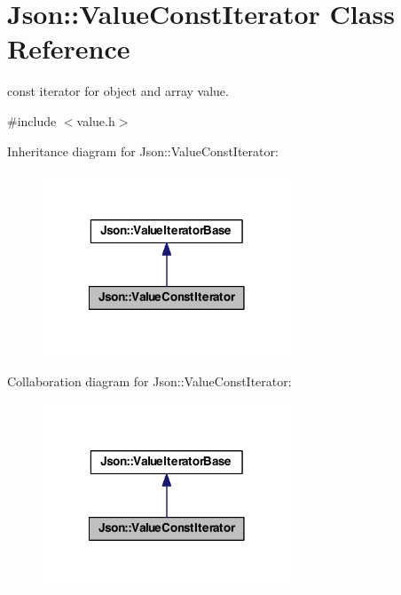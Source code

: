 \hypertarget{class_json_1_1_value_const_iterator}{\section{Json\-:\-:Value\-Const\-Iterator Class Reference}
\label{class_json_1_1_value_const_iterator}
}


const iterator for object and array value.  




{\ttfamily \#include $<$value.\-h$>$}



Inheritance diagram for Json\-:\-:Value\-Const\-Iterator\-:
\nopagebreak
\begin{figure}[H]
\begin{center}
\leavevmode
\includegraphics[width=210pt]{class_json_1_1_value_const_iterator__inherit__graph}
\end{center}
\end{figure}


Collaboration diagram for Json\-:\-:Value\-Const\-Iterator\-:
\nopagebreak
\begin{figure}[H]
\begin{center}
\leavevmode
\includegraphics[width=210pt]{class_json_1_1_value_const_iterator__coll__graph}
\end{center}
\end{figure}
